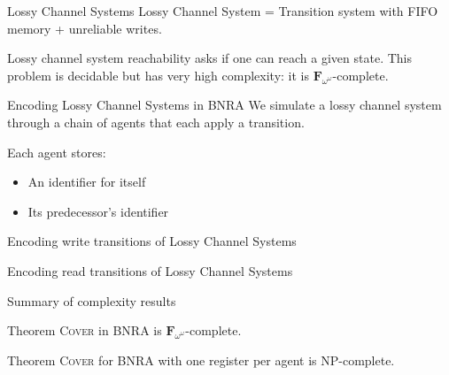 \documentclass{beamer}
\newcommand{\COVER}{\textsc{Cover}\xspace}
\begin{document}
\begin{frame}{Lossy Channel Systems}
	Lossy Channel System = Transition system with FIFO memory + unreliable writes.
	
	\begin{center}
	\resizebox{!}{4.5cm}{
	
	}
	\end{center}

	 Lossy channel system reachability asks if one can reach a given state. This problem is decidable but has very high complexity: it is $\mathbf{F}_{\omega^\omega}$-complete. 
\end{frame}


\begin{frame}{Encoding Lossy Channel Systems in BNRA}
	We simulate a lossy channel system through a chain of agents that each apply a transition.
	
	Each agent stores:
	\begin{itemize}
		\item An identifier for itself
		
		\item Its predecessor's identifier
	\end{itemize} 
	
	\centering
	
	
\end{frame}


\begin{frame}{Encoding write transitions of Lossy Channel Systems}
	\centering
	

\end{frame}

\begin{frame}{Encoding read transitions of Lossy Channel Systems}
	\centering
	 
\end{frame}

\begin{frame}{Summary of complexity results}

	\begin{block}{Theorem}
		{\COVER} in BNRA is $\mathbf{F}_{\omega^\omega}$-complete.
	\end{block}
		
	\pause
	\begin{block}{Theorem}
	\COVER{} for BNRA with one register per agent is NP-complete. 
	\end{block}
\end{frame}
\end{document}
